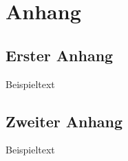 	
	
	\appendix
	\part*{Anhang}
	\chapter{Erster Anhang}
	Beispieltext
	
	
	
	
	\chapter{Zweiter Anhang}
	Beispieltext
	
	
	
		
	
	


